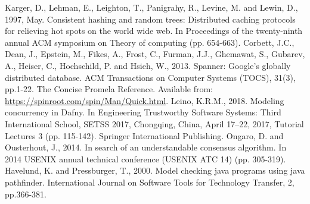 \begin{thebibliography}{9}
Karger, D., Lehman, E., Leighton, T., Panigrahy, R., Levine, M. and Lewin, D., 1997, May. Consistent hashing and random trees: Distributed caching protocols for relieving hot spots on the world wide web. In Proceedings of the twenty-ninth annual ACM symposium on Theory of computing (pp. 654-663).
Corbett, J.C., Dean, J., Epstein, M., Fikes, A., Frost, C., Furman, J.J., Ghemawat, S., Gubarev, A., Heiser, C., Hochschild, P. and Hsieh, W., 2013. Spanner: Google’s globally distributed database. ACM Transactions on Computer Systems (TOCS), 31(3), pp.1-22.
The Concise Promela Reference.
Available from: \url{https://spinroot.com/spin/Man/Quick.html}.
Leino, K.R.M., 2018. Modeling concurrency in Dafny. In Engineering Trustworthy Software Systems: Third International School, SETSS 2017, Chongqing, China, April 17–22, 2017, Tutorial Lectures 3 (pp. 115-142). Springer International Publishing.
Ongaro, D. and Ousterhout, J., 2014. In search of an understandable consensus algorithm. In 2014 USENIX annual technical conference (USENIX ATC 14) (pp. 305-319).
Havelund, K. and Pressburger, T., 2000. Model checking java programs using java pathfinder. International Journal on Software Tools for Technology Transfer, 2, pp.366-381.
\end{thebibliography}